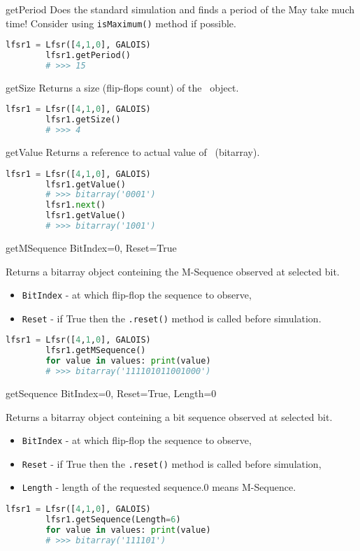  {getPeriod} {} {
	Does the standard simulation and finds a period of the \Lfsr\. May take much time! Consider using \texttt{isMaximum()} method if possible.
}
\begin{lstlisting}[language=Python]
		lfsr1 = Lfsr([4,1,0], GALOIS)
		lfsr1.getPeriod()
		# >>> 15
\end{lstlisting}

 {getSize} {} {
	Returns a size (flip-flops count) of the \Lfsr\ object.
}
\begin{lstlisting}[language=Python]
		lfsr1 = Lfsr([4,1,0], GALOIS)
		lfsr1.getSize()
		# >>> 4
\end{lstlisting}

 {getValue} {} {
	Returns a reference to actual value of \Lfsr\ (bitarray).
}
\begin{lstlisting}[language=Python]
		lfsr1 = Lfsr([4,1,0], GALOIS)
		lfsr1.getValue()
		# >>> bitarray('0001')
		lfsr1.next()
		lfsr1.getValue()
		# >>> bitarray('1001')
\end{lstlisting}

 {getMSequence} {BitIndex=0, Reset=True} {
	Returns a bitarray object conteining the M-Sequence observed at selected bit.
	\begin{itemize}
		\item \texttt{BitIndex} - at which flip-flop the sequence to observe,
		\item \texttt{Reset} - if True then the \texttt{.reset()} method is called before simulation.
	\end{itemize}
}
\begin{lstlisting}[language=Python]
		lfsr1 = Lfsr([4,1,0], GALOIS)
		lfsr1.getMSequence()
		for value in values: print(value)
		# >>> bitarray('111101011001000')
\end{lstlisting}

 {getSequence} {BitIndex=0, Reset=True, Length=0} {
	Returns a bitarray object conteining a bit sequence observed at selected bit.
	\begin{itemize}
		\item \texttt{BitIndex} - at which flip-flop the sequence to observe,
		\item \texttt{Reset} - if True then the \texttt{.reset()} method is called before simulation,
		\item \texttt{Length} - length of the requested sequence.0 means M-Sequence.
	\end{itemize}
}
\begin{lstlisting}[language=Python]
		lfsr1 = Lfsr([4,1,0], GALOIS)
		lfsr1.getSequence(Length=6)
		for value in values: print(value)
		# >>> bitarray('111101')
\end{lstlisting}

